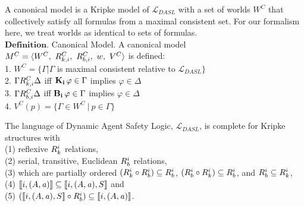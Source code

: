 A canonical model is a Kripke model of $\mathcal{L}_{DASL}$ with a set of worlds $W^C$ that collectively satisfy all formulas from a maximal consistent set. For our formalism here, we treat worlds as identical to sets of formulas.
\\
$\mathbf{Definition}$. Canonical Model. A canonical model $M^C = \langle W^C,\ R_{k,i}^C,\ R_{b,i}^C,\ w,\ V^C\rangle$ is defined:\\
1. $W^C = \{\Gamma | \Gamma$ is maximal consistent relative to $\mathcal{L}_{DASL} \}$\\
2. $\Gamma R_{k,i}^C \Delta$ iff $\mathbf{K}_{\mathbf{i}}\,\varphi \in \Gamma$ implies $\varphi \in \Delta$\\
3. $\Gamma R_{b,i}^C \Delta$ iff $\mathbf{B}_{\mathbf{i}}\,\varphi \in \Gamma$ implies $\varphi \in \Delta$\\
4. $V^C(p) = \{\Gamma \in W^C\ |\ p \in \Gamma\}$\\


\begin{tcolorbox}
	\begin{theorem}[Completeness]
		The language of Dynamic Agent Safety Logic, $\mathcal{L}_{DASL}$, is complete for Kripke structures with\\ (1) reflexive $R_{k}^i$ relations,\\ (2) serial, transitive, Euclidean $R_{b}^i$ relations, \\(3) which are partially ordered $(R_{k}^i \circ R_{b}^i) \subseteq R_{b}^i$, $(R_{b}^i \circ R_{k}^i) \subseteq R_{b}^i$, and $R_{b}^i \subseteq R_{k}^i$, \\(4) $\llbracket i,(A,\mathit{a})\rrbracket \subseteq \llbracket i,(A,\mathit{a}),S\rrbracket$%
		and\\ (5) $(\llbracket i,(A,\mathit{a}),S\rrbracket \circ R_{b}^i) \subseteq \llbracket i, (A,\mathit{a})\rrbracket$.
	\end{theorem}
\end{tcolorbox}


